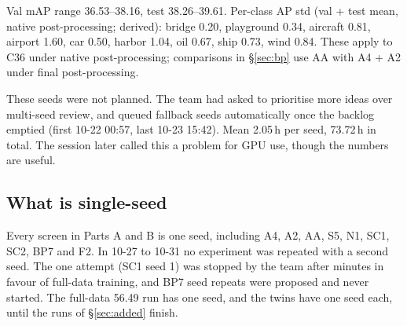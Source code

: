 Val mAP range 36.53--38.16, test 38.26--39.61. Per-class AP std (val + test mean, native post-processing; derived): bridge 0.20, playground 0.34, aircraft 0.81, airport 1.60, car 0.50, harbor 1.04, oil 0.67, ship 0.73, wind 0.84. These apply to C36 under native post-processing; comparisons in \S\ref{sec:bp} use AA with A4 + A2 under final post-processing.

These seeds were not planned. The team had asked to prioritise more ideas over multi-seed review, and  queued fallback seeds automatically once the backlog emptied (first 10-22 00:57, last 10-23 15:42). Mean 2.05\,h per seed, 73.72\,h in total. The session later called this a problem for GPU use, though the numbers are useful.

\subsection{What is single-seed}

Every screen in Parts A and B is one seed, including A4, A2, AA, S5, N1, SC1, SC2, BP7 and F2. In 10-27 to 10-31 no experiment was repeated with a second seed. The one attempt (SC1 seed 1) was stopped by the team after minutes in favour of full-data training, and BP7 seed repeats were proposed and never started. The full-data 56.49 run has one seed, and the twins have one seed each, until the runs of \S\ref{sec:added} finish.

